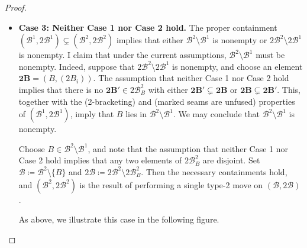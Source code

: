 \documentclass[11pt]{amsart}
\theoremstyle{definition}
\theoremstyle{remark}
\theoremstyle{plain}
\newcommand{\btB}{{\mathbf{2B}}}
\newcommand{\sB}{\mathscr{B}}
\newcommand{\stB}{2\mathscr{B}}
\begin{document}
\begin{proof}
\begin{itemize}
\item[] {\bf Case 3: Neither Case 1 nor Case 2 hold.}
The proper containment $(\sB^1,\stB^1) \subsetneq (\sB^2,\stB^2)$ implies that either $\sB^2\setminus \sB^1$ is nonempty or $\stB^2\setminus \stB^1$ is nonempty.
I claim that under the current assumptions, $\sB^2\setminus \sB^1$ must be nonempty.
Indeed, suppose that $\stB^2\setminus\stB^1$ is nonempty, and choose an element $\btB = (B, (2B_i))$.
The assumption that neither Case 1 nor Case 2 hold implies that there is no $\btB' \in \stB^2_B$ with either $\btB' \subsetneq \btB$ or $\btB \subsetneq \btB'$.
This, together with the {\sc (2-bracketing)} and {\sc(marked seams are unfused)} properties of $(\sB^1,\stB^1)$, imply that $B$ lies in $\sB^2\setminus \sB^1$.
We may conclude that $\sB^2\setminus\sB^1$ is nonempty.

Choose $B\in \sB^2\setminus\sB^1$, and note that the assumption that neither Case 1 nor Case 2 hold implies that any two elements of $\stB^2_B$ are disjoint.
Set $\sB \coloneqq \sB^2\setminus\{B\}$ and $\stB \coloneqq \stB^2\setminus \stB^2_B$.
Then the necessary containments hold, and $(\sB^2,\stB^2)$ is the result of performing a single type-2 move on $(\sB,\stB)$.


As above, we illustrate this case in the following figure.

\begin{figure}[H]
\centering
\def\svgwidth{0.95\columnwidth}

\label{fig:2nu_poset_map_example_3}
\end{figure}

\end{itemize}
\end{proof}


\end{document}
